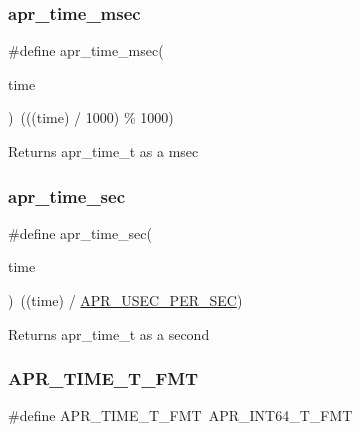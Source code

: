 \subsubsection{\texorpdfstring{apr\+\_\+time\+\_\+msec}{apr\_time\_msec}}
{\footnotesize\ttfamily \#define apr\+\_\+time\+\_\+msec(\begin{DoxyParamCaption}\item[{}]{time }\end{DoxyParamCaption})~(((time) / 1000) \% 1000)}

\begin{DoxyReturn}{Returns}
apr\+\_\+time\+\_\+t as a msec 
\end{DoxyReturn}
\mbox{\label{group__apr__time_gae0237f70a9a3206b5263c0a474219476}} 
\subsubsection{\texorpdfstring{apr\+\_\+time\+\_\+sec}{apr\_time\_sec}}
{\footnotesize\ttfamily \#define apr\+\_\+time\+\_\+sec(\begin{DoxyParamCaption}\item[{}]{time }\end{DoxyParamCaption})~((time) / \mbox{\hyperlink{group__apr__time_gab4dd3f3015d25a50f3be3e0e91043abf}{A\+P\+R\+\_\+\+U\+S\+E\+C\+\_\+\+P\+E\+R\+\_\+\+S\+EC}})}

\begin{DoxyReturn}{Returns}
apr\+\_\+time\+\_\+t as a second 
\end{DoxyReturn}
\mbox{\label{group__apr__time_gaad2d372b64a68d96b1e4c5f1173eb2c7}} 
\subsubsection{\texorpdfstring{A\+P\+R\+\_\+\+T\+I\+M\+E\+\_\+\+T\+\_\+\+F\+MT}{APR\_TIME\_T\_FMT}}
{\footnotesize\ttfamily \#define A\+P\+R\+\_\+\+T\+I\+M\+E\+\_\+\+T\+\_\+\+F\+MT~A\+P\+R\+\_\+\+I\+N\+T64\+\_\+\+T\+\_\+\+F\+MT}

